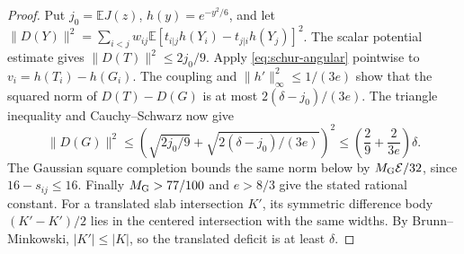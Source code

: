 \documentclass[11pt,a4paper]{article}
\theoremstyle{remark}\newtheorem{remark}[theorem]{Remark}
\numberwithin{equation}{section}
\begin{document}
\begin{proof}
Put \(j_0=\mathbb E J(z)\), \(h(y)=e^{-y^2/6}\), and let
\(\|D(Y)\|^2=\sum_{i<j}w_{ij}\mathbb E
 [t_{i|j}h(Y_i)-t_{j|i}h(Y_j)]^2\).
The scalar potential estimate gives \(\|D(T)\|^2\le 2j_0/9\).
Apply \eqref{eq:schur-angular} pointwise to \(v_i=h(T_i)-h(G_i)\).
The coupling and \(\|h'\|_\infty^2\le 1/(3e)\) show that the squared
norm of \(D(T)-D(G)\) is at most \(2(\delta-j_0)/(3e)\).
The triangle inequality and Cauchy--Schwarz now give
\[
 \|D(G)\|^2\le
 \left(\sqrt{2j_0/9}+\sqrt{2(\delta-j_0)/(3e)}\right)^2
 \le \left(\frac29+\frac2{3e}\right)\delta .
\]
The Gaussian square completion bounds the same norm below by
\(M_{\rm G}\mathcal E/32\), since \(16-s_{ij}\le16\).
Finally \(M_{\rm G}>77/100\) and \(e>8/3\) give the stated rational
constant. For a translated slab intersection \(K'\), its symmetric
difference body \((K'-K')/2\) lies in the centered intersection with
the same widths. By Brunn--Minkowski, \(|K'|\le |K|\), so the
translated deficit is at least \(\delta\).
\end{proof}
\end{document}
